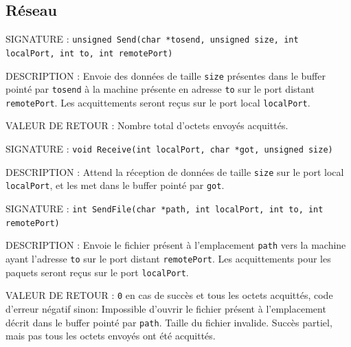 \documentclass{article}
\begin{document}
	\subsection{Réseau}
		\begin{description}
			\item{SIGNATURE : } \texttt{unsigned Send(char *tosend, unsigned size, int localPort, int to, int remotePort)}
			\item{DESCRIPTION : Envoie des données de taille \texttt{size} présentes dans le buffer pointé par \texttt{tosend} à la machine présente en adresse \texttt{to} sur le port distant \texttt{remotePort}. Les acquittements seront reçus sur le port local \texttt{localPort}.} 
			\item{VALEUR DE RETOUR : Nombre total d'octets envoyés acquittés.} 
		\end{description}
		\vspace{2.5mm}
		\begin{description}
			\item{SIGNATURE : } \texttt{void Receive(int localPort, char *got, unsigned size)}
			\item{DESCRIPTION : Attend la réception de données de taille \texttt{size} sur le port local \texttt{localPort}, et les met dans le buffer pointé par \texttt{got}.} 
		\end{description}
		\vspace{2.5mm}
		\begin{description}
			\item{SIGNATURE : } \texttt{int SendFile(char *path, int localPort, int to, int remotePort)}
			\item{DESCRIPTION : Envoie le fichier présent à l'emplacement \texttt{path} vers la machine ayant l'adresse \texttt{to} sur le port distant \texttt{remotePort}. Les acquittements pour les paquets seront reçus sur le port \texttt{localPort}.} 
			\item{VALEUR DE RETOUR : } \texttt{0} en cas de succès et tous les octets acquittés, code d'erreur négatif sinon: 
				 Impossible d'ouvrir le fichier présent à l'emplacement décrit dans le buffer pointé par \texttt{path}.
				 Taille du fichier invalide.
				 Succès partiel, mais pas tous les octets envoyés ont été acquittés.
		\end{description}
		\vspace{2.5mm}
\end{document}
